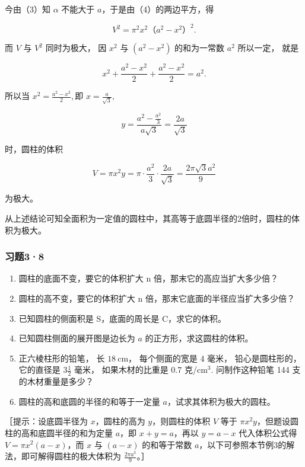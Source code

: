 今由（3）知 \(\alpha\) 不能大于 \(a\)，于是由（4）的两边平方，得

\[
V ^ {2} = \pi^ {2} x ^ {2} \text{（}a ^ {2} - x ^ {2}\text{）} ^ {2}.
\]

而 \(V\) 与 \(V^2\) 同时为极大， 因 \(x^2\) 与 \((a^2 - x^2)\)
的和为一常数 \(a^2\) 所以一定， 就是

\[
x ^ {2} + \frac {a ^ {2} - x ^ {2}}{2} + \frac {a ^ {2} - x ^ {2}}{2} = a ^ {2}.
\]

所以当 \(x^{2} = \frac{a^{2} - x^{2}}{2},\)即
\(x = \frac{a}{\sqrt{3}},\)

\[
y = \frac {a ^ {2} - \frac {a ^ {2}}{3}}{a \sqrt {3}} = \frac {2 a}{\sqrt {3}}
\]

时，圆柱的体积

\[
V = \pi x ^ {2} y = \pi \cdot \frac {a ^ {2}}{3} \cdot \frac {2 a}{\sqrt {3}} = \frac {2 \pi \sqrt {3} a ^ {2}}{9}
\]

为极大。

从上述结论可知全面积为一定值的圆柱中，其高等于底圆半径的2倍时，圆柱的体积为极大。

\subsubsection{习题3·8}

\begin{enumerate}
\item
  圆柱的底面不变，要它的体积扩大 n 倍，那末它的高应当扩大多少倍？
\item
  圆柱的高不变，要它的体积扩大 n 倍，那末它底面的半径应当扩大多少倍？
\item
  已知圆柱的侧面积是 S，底面的周长是 C，求它的体积。
\item
  已知圆柱侧面的展开图是边长为 \(a\) 的正方形，求这圆柱的体积。
\item
  正六棱柱形的铅笔， 长 \(18 \mathrm{~cm}\)， 每个侧面的宽是 4 毫米，
  铅心是圆柱形的， 它的直径是 \(3 \frac{1}{2}\) 毫米， 如果木材的比重是
  0.7 克/\(\mathrm{cm}^{3}\). 问制作这种铅笔 144 支的木材重量是多少？
\item
  圆柱的高和底圆的半径的和等于一定量 \(a\)，试求其体积为极大的圆柱。
\end{enumerate}

［提示：设底圆半径为 \(x\)，圆柱的高为 \(y\)，则圆柱的体积 \(V\) 等于
\(\pi x^2 y\)，但题设圆柱的高和底圆半径的和为定量 \(a\)，即
\(x + y = a\)，再以 \(y = a - x\) 代入体积公式得
\(V = \pi x^2 (a - x)\)，而 \(x\) 与 \((a - x)\) 的和等于常数
\(a\)，以下可参照本节例3的解法，即可解得圆柱的极大体积为
\(\frac{2\pi a^3}{9}\)。］

